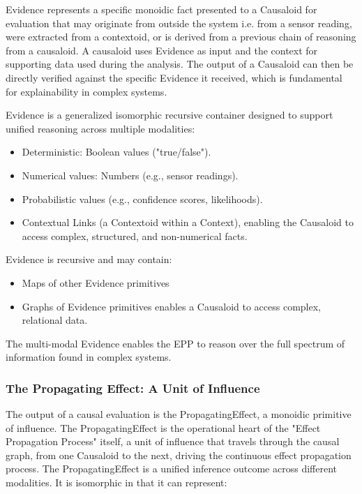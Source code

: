Evidence represents a specific monoidic fact presented to a Causaloid for evaluation that may originate from outside the system i.e. from a sensor reading, were extracted from a contextoid, or is derived from a previous chain of reasoning from a causaloid. A causaloid uses Evidence as input and the context for supporting data used during the analysis. The output of a Causaloid can then be directly verified against the specific Evidence it received, which is fundamental for explainability in complex systems.

Evidence is a generalized isomorphic recursive container designed to support unified reasoning across multiple modalities:

\begin{itemize}
	\item Deterministic: Boolean values ("true/false").
	\item Numerical values: Numbers (e.g., sensor readings).
	\item Probabilistic values (e.g., confidence scores, likelihoods).
	\item Contextual Links (a Contextoid within a Context), enabling the Causaloid to access complex, structured, and non-numerical facts.
\end{itemize}

Evidence is recursive and may contain:
\begin{itemize}
	\item Maps of other Evidence primitives
	\item Graphs of Evidence primitives enables a Causaloid to access complex, relational data.
\end{itemize}

The multi-modal Evidence enables the EPP to reason over the full  spectrum of information found in complex systems.

\subsubsection{The Propagating Effect: A Unit of Influence}
\label{sec:ontology_propagating_effect}

The output of a causal evaluation is the PropagatingEffect, a monoidic primitive of influence. The PropagatingEffect is the operational heart of the "Effect Propagation Process" itself, a unit of influence that travels through the causal graph, from one Causaloid to the next, driving the continuous effect propagation process. The PropagatingEffect is a unified inference outcome across different modalities. It is isomorphic in that it can represent:


